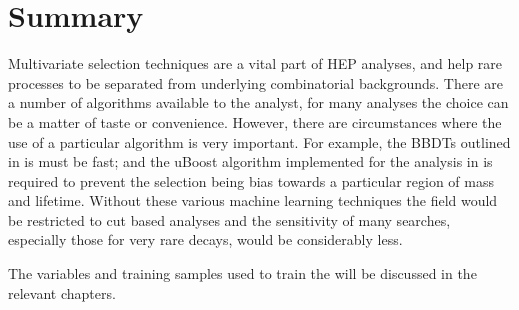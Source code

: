 \section{Summary}
Multivariate selection techniques are a vital part of \gls{HEP} analyses, and help rare
processes to be separated from underlying combinatorial backgrounds.
There are a number of algorithms available to the analyst, for many analyses the choice can be a
matter of taste or convenience.
However, there are circumstances where the use of a particular algorithm is very important.
For example, the \glspl{BBDT} outlined in  is must be fast; and the uBoost
algorithm implemented for the analysis in  is required to prevent the selection being
bias towards a particular region of mass and lifetime.
Without these various machine learning techniques the field would be restricted to cut based
analyses and the sensitivity of many searches, especially those for very rare decays, would be
considerably less.

The variables and training samples used to train the \BDTs will be discussed in the relevant
chapters.
